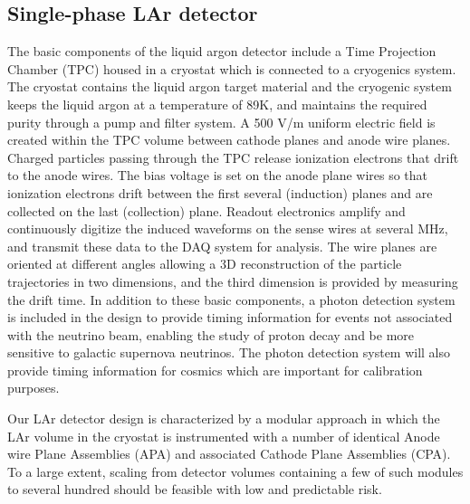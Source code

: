 \subsection{Single-phase LAr detector}


The basic components of the liquid argon detector include a Time Projection Chamber (TPC) housed in a cryostat which is connected to  
a cryogenics system. 
%
The cryostat contains the liquid argon target material and the cryogenic system keeps the liquid argon at a temperature of 89K, and maintains the required purity through a pump and filter system. A 500 V/m uniform electric field is created within the TPC volume between cathode planes and anode wire planes. Charged particles passing through the TPC release ionization electrons that drift to the anode wires. The bias voltage is set on the anode plane wires so that ionization electrons drift between the first several (induction) planes and are collected on the last (collection) plane. Readout electronics amplify and continuously digitize the induced waveforms on the sense wires at several MHz, and transmit these data to the DAQ system for analysis. The wire planes are oriented at different angles allowing a 3D reconstruction of the particle trajectories in two dimensions, and the third dimension is provided by measuring the drift time. In addition to these basic components, a photon detection system
is included in the design to provide timing information for events not associated with the neutrino beam, enabling the study of proton decay and be more sensitive to galactic supernova neutrinos.  The photon detection system will also provide timing information for cosmics which are important for calibration purposes.

Our LAr detector design is characterized by a modular approach in which the LAr volume in the cryostat is instrumented with a number of identical Anode wire Plane Assemblies (APA) and associated Cathode Plane Assemblies (CPA). To a large extent, scaling from detector volumes containing a few of such modules  to several hundred should be feasible with low and predictable risk.\\









%






